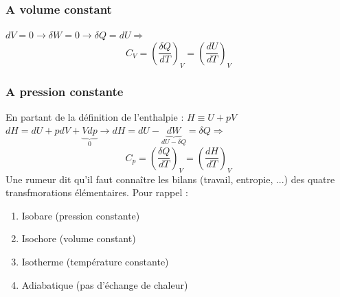 \documentclass[11pt, a4paper, openany]{book}
\begin{document}
\subsubsection*{A volume constant}
$dV = 0\rightarrow \delta W = 0 \rightarrow \delta Q = dU \Rightarrow$
\begin{equation}
C_V = \left(\frac{\delta Q}{dT}\right)_V = \left(\frac{dU}{dT}\right)_V
\end{equation}

\subsubsection*{A pression constante}
En partant de la définition de l'enthalpie : $H \equiv U + pV$\\
$dH = dU + pdV + \underbrace{Vdp}_0 \rightarrow dH =  dU - \underbrace{dW}_{dU-\delta Q} = \delta Q \Rightarrow$
\begin{equation}
C_p = \left(\frac{\delta Q}{dT}\right)_V = \left(\frac{dH}{dT}\right)_V
\end{equation}
Une rumeur dit qu'il faut connaître les bilans (travail, entropie, ...) des quatre transfmorations élémentaires. Pour rappel :
\begin{enumerate}
\item Isobare (pression constante)
\item Isochore (volume constant)
\item Isotherme (température constante)
\item Adiabatique (pas d'échange de chaleur)
\end{enumerate}
\end{document}
